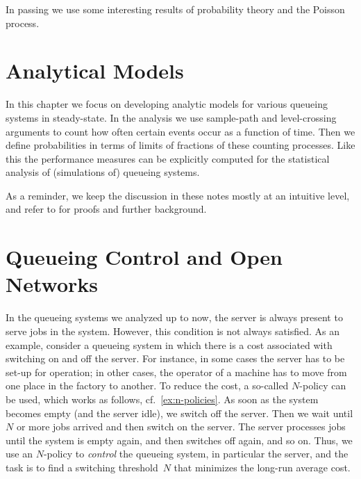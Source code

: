 In passing we use some interesting results of probability theory and the Poisson process. 





%


\chapter{Analytical Models}
\label{cha:analytical-models}

In this chapter we focus on developing analytic models for various queueing systems in steady-state.
In the analysis we use sample-path and level-crossing arguments to count how often certain events occur as a function of time.
Then we define probabilities in terms of limits of fractions of these counting processes.
Like this the performance measures can be explicitly computed for the statistical analysis of (simulations of) queueing systems.


As a reminder, we keep the discussion in these notes mostly at an intuitive level, and refer to \cite{el-taha98:_sampl_path_analy_queuein_system} for proofs and further background.













% 
%



\chapter{Queueing Control and Open Networks}
\label{cha:queu-contr-open}

In the queueing systems we analyzed up to now, the server is always present to serve jobs in the system. However, this condition is not always satisfied.
As an example, consider a queueing system in which there is a cost associated with switching on and off the server.
For instance, in some cases the server has to be set-up for operation; in other cases, the operator of a machine has to move from one place in the factory to another.
To reduce the cost, a so-called $N$-policy can be used, which works as follows, cf.~\cref{ex:n-policies}.
As soon as the system becomes empty (and the server idle), we switch off the server.
Then we wait until $N$ or more jobs arrived and then switch on the server.
The server processes jobs until the system is empty again, and then switches off again, and so on.
Thus, we use an $N$-policy to \emph{control} the queueing system, in particular the server, and the task is to find a switching threshold~$N$ that minimizes the long-run average cost.

